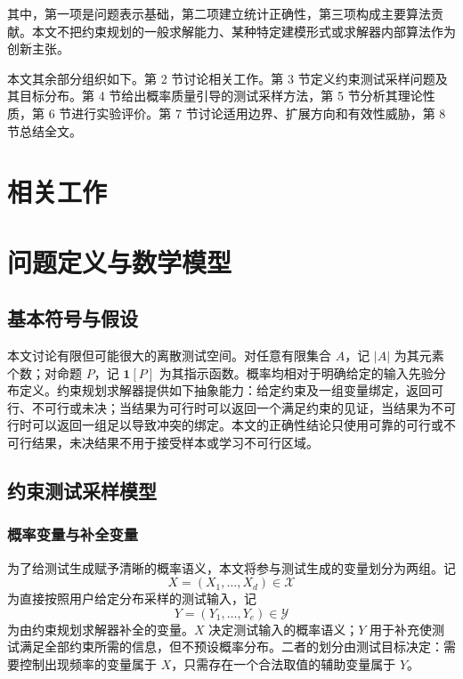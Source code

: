 \documentclass[UTF8, fontset=none, a4paper, 12pt]{ctexart}
\newcommand{\InputSpace}{\mathcal{X}}
\newcommand{\WitnessSpace}{\mathcal{Y}}
\begin{document}
其中，第一项是问题表示基础，第二项建立统计正确性，第三项构成主要算法贡献。本文不把约束规划的一般求解能力、某种特定建模形式或求解器内部算法作为创新主张。

本文其余部分组织如下。第 2 节讨论相关工作。第 3 节定义约束测试采样问题及其目标分布。第 4 节给出概率质量引导的测试采样方法，第 5 节分析其理论性质，第 6 节进行实验评价。第 7 节讨论适用边界、扩展方向和有效性威胁，第 8 节总结全文。

\section{相关工作}


\section{问题定义与数学模型}

\subsection{基本符号与假设}

本文讨论有限但可能很大的离散测试空间。对任意有限集合 $A$，记 $|A|$ 为其元素个数；对命题 $P$，记 $\mathbf{1}[P]$ 为其指示函数。概率均相对于明确给定的输入先验分布定义。约束规划求解器提供如下抽象能力：给定约束及一组变量绑定，返回可行、不可行或未决；当结果为可行时可以返回一个满足约束的见证，当结果为不可行时可以返回一组足以导致冲突的绑定。本文的正确性结论只使用可靠的可行或不可行结果，未决结果不用于接受样本或学习不可行区域。

\subsection{约束测试采样模型}

\subsubsection{概率变量与补全变量}

为了给测试生成赋予清晰的概率语义，本文将参与测试生成的变量划分为两组。记
\[
  X=(X_1,\ldots,X_d)\in\InputSpace
\]
为直接按照用户给定分布采样的测试输入，记
\[
  Y=(Y_1,\ldots,Y_e)\in\WitnessSpace
\]
为由约束规划求解器补全的变量。$X$ 决定测试输入的概率语义；$Y$ 用于补充使测试满足全部约束所需的信息，但不预设概率分布。二者的划分由测试目标决定：需要控制出现频率的变量属于 $X$，只需存在一个合法取值的辅助变量属于 $Y$。
\end{document}
